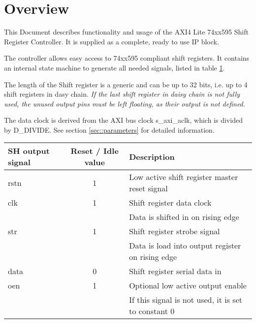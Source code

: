 


\maketitle

\section{Overview}
This Document describes functionality and usage of the AXI4 Lite 74xx595 Shift Register Controller.
It is supplied as a complete, ready to use IP block.

The controller allows easy access to 74xx595 compliant shift registers.
It contains an internal state machine to generate all needed signals, listed in table \ref{tbl::signals}.

The length of the Shift register is a generic and can be up to 32 bits, i.e. up to 4 shift registers in dasy chain.
\emph{If the last shift register in daisy chain is not fully used, the unused output pins must be left floating, as their output is not defined.}

The data clock is derived from the AXI bus clock s\_axi\_aclk, which is divided by D\_DIVIDE.
See section \ref{sec::parameters} for detailed information.

\begin{table}[htbp]
	
	\label{tbl::signals}
	\begin{tabular}{|l|c|l|}
		\hline 
		SH output signal & Reset / Idle value & Description \\ 
		\hline 
		rstn & 1 & Low active shift register master reset signal \\ 
		\hline 
		clk & 1 & Shift register data clock \\
		& & Data is shifted in on rising edge \\ 
		\hline 
		str & 1 & Shift register strobe signal \\
		 & & Data is load into output register on rising edge\\ 
		\hline 
		data & 0 & Shift register serial data in \\ 
		\hline 
		oen & 1 & Optional low active output enable \\
		& & If this signal is not used, it is set to constant 0 \\ 
		\hline 
	\end{tabular} 

\end{table}

